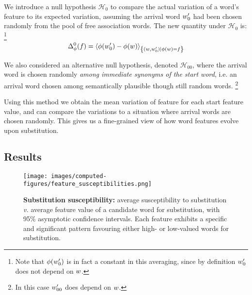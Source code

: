 We introduce a null hypothesis $\mathcal{H}_0$ to compare the actual variation of a word's feature to its expected variation, assuming the arrival word $w'_0$ had been chosen randomly from the pool of free association words.
The new quantity under $\mathcal{H}_0$ is:
\footnote{Note that $\phi(w'_0)$ is in fact a constant in this averaging, since by definition $w'_0$ does not depend on $w$.}
$$\Delta_{\phi}^0 (f) = \left< \phi({w'_0}) - \phi(w) \right>_{\left\lbrace (w,w'_0) | \phi(w) = f \right\rbrace}$$

We also considered an alternative null hypothesis, denoted $\mathcal{H}_{00}$, where the arrival word is chosen randomly \emph{among immediate synonyms of the start word}, i.e. an arrival word chosen among semantically plausible though still random words.
\footnote{In this case $w'_{00}$ does depend on $w$.} 

Using this method we obtain the mean variation of feature for each start feature value, and can compare the variations to a situation where arrival words are chosen randomly.
This gives us a fine-grained view of how word features evolve upon substitution.

\subsection{Results}


\begin{figure*}[!th]
    \centering
    \texttt{[image: images/computed-figures/feature\_susceptibilities.png]}
    \caption{\textbf{Substitution susceptibility:} average susceptibility to substitution \emph{v.} average feature value of a candidate word for substitution, with 95\% asymptotic confidence intervals.
    Each feature exhibits a specific and significant pattern favouring either high- or low-valued words for substitution.}
    \label{fig:feature-susceptibilities}
\end{figure*}


